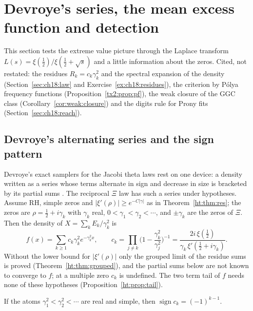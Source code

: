 \section{Devroye's series, the mean excess function and detection}\label{ev:sec:devroye}

This section tests the extreme value picture through the Laplace transform $L(s)=\xi(\frac12)/\xi(\frac12+\sqrt s)$ and a little information about the zeros. Cited, not restated: the residues $R_k=c_k\gamma_k^2$ and the spectral expansion of the density (Section~\ref{sec:ch18:law} and Exercise~\ref{ex:ch18:residues}), the criterion by P\'olya frequency functions (Proposition~\ref{tx2:prop:pf}), the weak closure of the GGC class (Corollary~\ref{cor:weak:closure}) and the digits rule for Prony fits (Section~\ref{sec:ch18:reach}).

\subsection{Devroye's alternating series and the sign pattern}\label{ev:sec:sign}

Devroye's exact samplers for the Jacobi theta laws rest on one device: a density written as a series whose terms alternate in sign and decrease in size is bracketed by its partial sums \cite{Devroye09,Devroye86}. %
The reciprocal $\Xi$ law has such a series under hypotheses. Assume RH, simple zeros and $|\xi'(\rho)|\ge e^{-C|\gamma|}$ as in Theorem~\ref{ht:thm:res}; the zeros are $\rho=\frac12+i\gamma_k$ with $\gamma_k$ real, $0<\gamma_1<\gamma_2<\cdots$, and $\pm\gamma_k$ are the zeros of $\Xi$. Then the density of $X=\sum_kE_k/\gamma_k^2$ is
\[
f(x)=\sum_{k\ge1}c_k\gamma_k^2e^{-\gamma_k^2x},\qquad c_k=\prod_{j\ne k}\Big(1-\frac{\gamma_k^2}{\gamma_j^2}\Big)^{-1}=\frac{2i\,\xi(\frac12)}{\gamma_k\,\xi'(\frac12+i\gamma_k)} .
\]
Without the lower bound for $|\xi'(\rho)|$ only the grouped limit of the residue sums is proved (Theorem~\ref{ht:thm:grouped}), and the partial sums below are not known to converge to $f$; at a multiple zero $c_k$ is undefined. The two term tail of $f$ needs none of these hypotheses (Proposition~\ref{ht:prop:tail}).

\begin{proposition}\label{ev:prop:sign}
If the atoms $\gamma_1^2<\gamma_2^2<\cdots$ are real and simple, then $\operatorname{sign}c_k=(-1)^{k-1}$.
\end{proposition}

